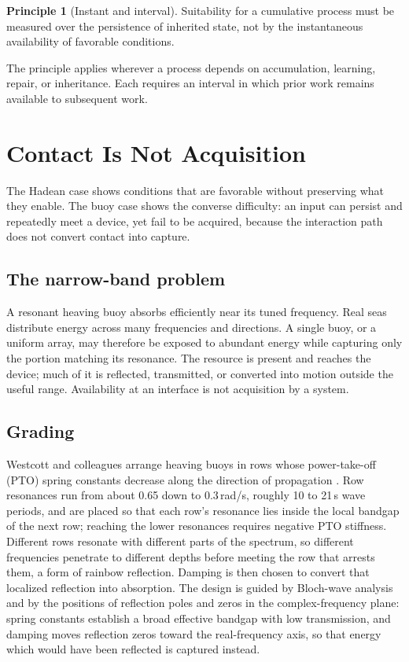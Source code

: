 \documentclass[11pt]{article}
\theoremstyle{definition}
\newtheorem{principle}{Principle}
\begin{document}
\begin{principle}[Instant and interval]
Suitability for a cumulative process must be measured over the persistence of inherited state, not by the instantaneous availability of favorable conditions.
\end{principle}

The principle applies wherever a process depends on accumulation, learning, repair, or inheritance. Each requires an interval in which prior work remains available to subsequent work.

\section{Contact Is Not Acquisition}\label{sec:contact}

The Hadean case shows conditions that are favorable without preserving what they enable. The buoy case shows the converse difficulty: an input can persist and repeatedly meet a device, yet fail to be acquired, because the interaction path does not convert contact into capture.

\subsection{The narrow-band problem}

A resonant heaving buoy absorbs efficiently near its tuned frequency. Real seas distribute energy across many frequencies and directions. A single buoy, or a uniform array, may therefore be exposed to abundant energy while capturing only the portion matching its resonance. The resource is present and reaches the device; much of it is reflected, transmitted, or converted into motion outside the useful range. Availability at an interface is not acquisition by a system.

\subsection{Grading}

Westcott and colleagues arrange heaving buoys in rows whose power-take-off (PTO) spring constants decrease along the direction of propagation \cite{westcott}. Row resonances run from about 0.65 down to 0.3\,rad/s, roughly 10 to 21\,s wave periods, and are placed so that each row's resonance lies inside the local bandgap of the next row; reaching the lower resonances requires negative PTO stiffness. Different rows resonate with different parts of the spectrum, so different frequencies penetrate to different depths before meeting the row that arrests them, a form of rainbow reflection. Damping is then chosen to convert that localized reflection into absorption. The design is guided by Bloch-wave analysis and by the positions of reflection poles and zeros in the complex-frequency plane: spring constants establish a broad effective bandgap with low transmission, and damping moves reflection zeros toward the real-frequency axis, so that energy which would have been reflected is captured instead.
\end{document}
